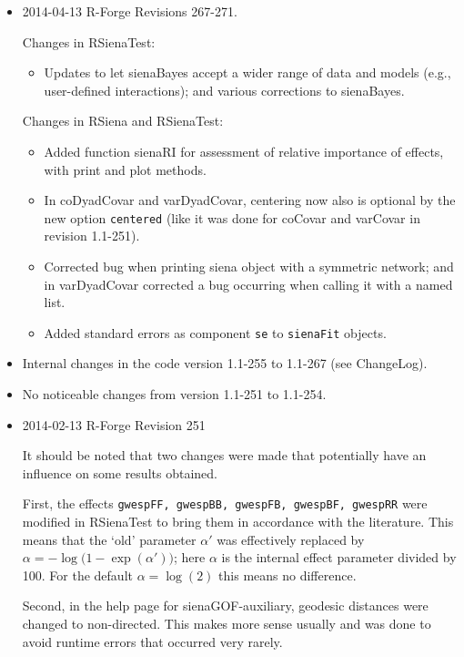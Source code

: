 \documentclass[a4paper,fleqn,11pt]{article}
\newcommand{\+}{\, + \,}
\newcommand{\sfn}[1]{\textsf{#1}}
\begin{document}
\begin{small}
\begin{itemize}
\item 2014-04-13 R-Forge Revisions 267-271.

Changes in \textsf{RSienaTest}:
\begin{itemize}
 \item Updates to let \sfn{sienaBayes} accept
     a wider range of data and models (e.g., user-defined interactions);
     and various corrections to \sfn{sienaBayes}.
\end{itemize}

Changes in \textsf{RSiena} and \textsf{RSienaTest}:
\begin{itemize}
\item Added function \sfn{sienaRI} for assessment of relative importance of effects,
      with print and plot methods.
\item In \sfn{coDyadCovar} and \sfn{varDyadCovar}, centering now also is
      optional by the new option \texttt{centered} (like it was done for
      \sfn{coCovar} and \sfn{varCovar} in revision 1.1-251).
\item Corrected bug when printing siena object with a symmetric network;
     and in \sfn{varDyadCovar} corrected a bug occurring when calling it
     with a named list.
\item Added standard errors as component \texttt{se} to \texttt{sienaFit}
     objects.
\end{itemize}


\item Internal changes in the code version 1.1-255 to 1.1-267 (see \sfn{ChangeLog}).

\item No noticeable changes from version 1.1-251 to 1.1-254.

\item 2014-02-13 R-Forge Revision 251

It should be noted that two changes were made that potentially
have an influence on some results obtained.

First, the effects \texttt{gwespFF, gwespBB, gwespFB, gwespBF, gwespRR}
were modified in \textsf{RSienaTest} to bring them in accordance with the literature.
This means that the `old' parameter $\alpha'$ was effectively replaced by
$\alpha = -\log\big(1-\exp(\alpha')\big)$; here $\alpha$ is the internal
effect parameter divided by 100. For the default $\alpha = \log(2)$
this means no difference.

Second, in the help page for \sfn{sienaGOF-auxiliary}, geodesic distances
were changed to non-directed. This makes more sense usually and was done to
avoid runtime errors that occurred very rarely.


\end{itemize}
\end{small}
\end{document}
